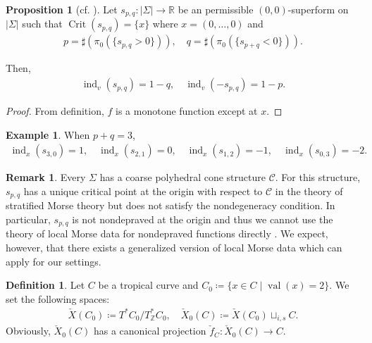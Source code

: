 \documentclass[a4paper,dvipdfmx,reqno,12pt]{amsart}
\theoremstyle{definition}
\newtheorem{definition}[theorem]{Definition}
\newtheorem{example}[theorem]{Example}
\newtheorem{proposition}[theorem]{Proposition}
\newtheorem{remark}[theorem]{Remark}
\newcommand{\deq}{\coloneqq}
\newcommand{\Z}{\mathbb{Z}}%
\newcommand{\opn}[1]{\operatorname{#1}}
\numberwithin{equation}{section}
\begin{document}
\begin{proposition}[{cf. \cite{knill2012graph}}]
\label{proposition-n-valent}
Let $s_{p,q}\colon |\Sigma|\to \mathbb{R}$ be 
an permissible $(0,0)$-superform on $|\Sigma|$ 
such that $\opn{Crit}(s_{p,q})=\{x\}$ where
$x=(0,\ldots,0)$ and
\begin{align}
p=\sharp(\pi_0(\{s_{p,q}>0\})), \quad 
q=\sharp(\pi_0(\{s_{p+q}<0\})).
\end{align}

Then, 
\begin{align}
\opn{ind}_v(s_{p,q})=1-q ,\quad \opn{ind}_v(-s_{p,q})=1-p.
\end{align}

\end{proposition}

\begin{proof}
From definition, $f$ is a monotone function except 
at $x$.
\end{proof}

\begin{example}
When $p+q=3$, 
\begin{align}
\opn{ind}_x(s_{3,0})=1, \quad 
\opn{ind}_x(s_{2,1})=0, \quad \opn{ind}_x(s_{1,2})=-1, 
\quad \opn{ind}_x(s_{0,3})=-2.
\end{align}
\end{example}

\begin{remark}
\label{remark-nondeprave-curve}
Every $\Sigma$ has a coarse polyhedral cone structure 
$\mathscr{C}$. 
For this structure, $s_{p,q}$ has a unique critical 
point at the origin with respect to 
$\mathscr{C}$ in the theory of stratified 
Morse theory \cite[Part I.2.1]{MR932724}
but does not satisfy the nondegeneracy condition.
In particular, $s_{p,q}$ is not nondepraved 
at the origin \cite[Part I.2.3.]{MR932724} 
and thus we cannot use the theory of local Morse 
data for nondepraved functions directly 
\cite[Part I.3.5.2 Definition]{MR932724}. 
We expect, however, that there exists a 
generalized version of local Morse data 
which can apply for our settings.
\end{remark}

\begin{definition}
\label{definition-continuous-section}
Let $C$ be a tropical curve and 
$C_{0}\deq \{x\in C\mid \opn{val}(x)=2\}$.
We set the following spaces:
\begin{align}
\check{X}(C_0)\deq T^{*}C_0/T^{*}_{\Z}C_0, \quad 
\check{X}_0(C)\deq \check{X}(C_0)\sqcup_{i,s}C.
\end{align}
Obviously, $\check{X}_0(C)$ has a canonical projection
$\check{f}_C \colon \check{X}_0(C)\to C$.
\end{definition}
\end{document}
